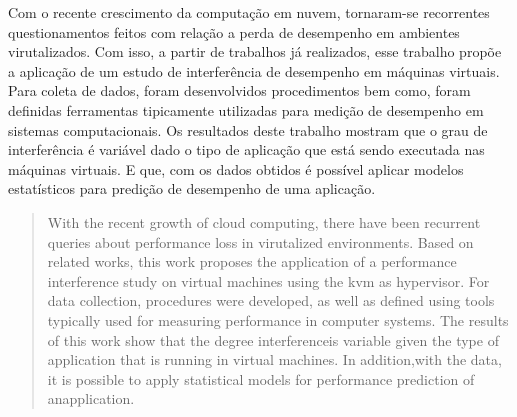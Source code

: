 \documentclass[[10pt,journal]{IEEEtran}
\begin{document}
% 











\maketitle

\begin{resumo}
Com o recente crescimento da computação em nuvem, tornaram-se recorrentes questionamentos feitos com relação a perda de desempenho em ambientes virutalizados. Com isso, a partir de trabalhos já realizados, esse trabalho propõe a aplicação de um estudo de interferência de desempenho em máquinas virtuais. Para coleta de dados, foram desenvolvidos procedimentos bem como, foram definidas ferramentas tipicamente utilizadas para medição de desempenho em sistemas computacionais.
Os resultados deste trabalho mostram que o grau de interferência é variável dado o tipo de aplicação que está sendo executada nas máquinas virtuais. E que, com os dados obtidos é possível aplicar modelos estatísticos para predição de desempenho de uma aplicação.
\end{resumo}

\begin{abstract}
With the recent growth of cloud computing, there have been recurrent queries about performance loss in virutalized environments. Based on related works, this work proposes the application of a performance interference study on virtual machines using the kvm as hypervisor. For data collection, procedures were developed, as well as defined using tools typically used for measuring performance in computer systems. The results of this work show that the degree interferenceis variable given the type of application that is running in virtual machines. In addition,with the data, it is possible to apply statistical models for performance prediction of anapplication.
\end{abstract}
\end{document}
